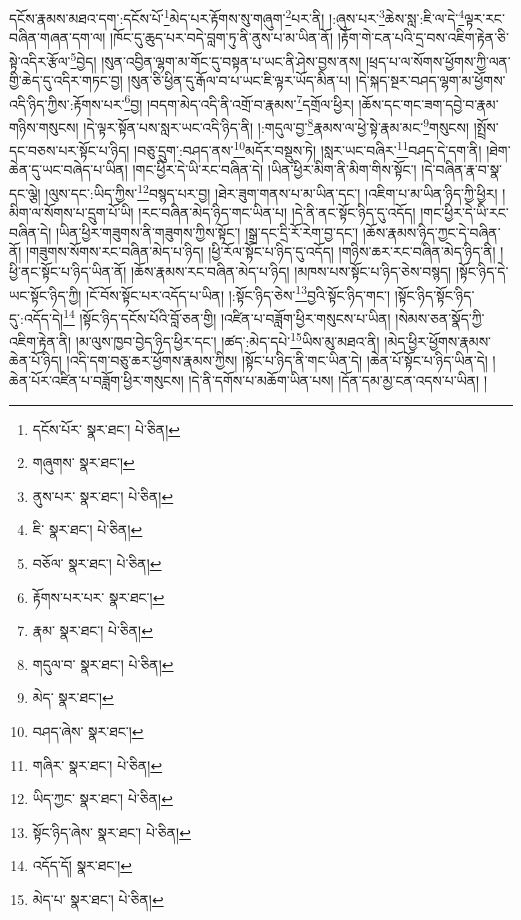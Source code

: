 དངོས་རྣམས་མཐའ་དག་:དངོས་པོ་\footnote{དངོས་པོར་  སྣར་ཐང་།  པེ་ཅིན། }མེད་པར་རྟོགས་སུ་གཞུག་\footnote{གཞུགས་  སྣར་ཐང་། }པར་ནི། །:ཞུས་པར་\footnote{ནུས་པར་  སྣར་ཐང་།  པེ་ཅིན། }ཆེས་སླ་:ཇི་ལ་དེ་\footnote{ཇི་  སྣར་ཐང་།  པེ་ཅིན། }ལྟར་རང་བཞིན་གཞན་དག་ལ། །ཁོང་དུ་ཆུད་པར་བདེ་བླག་ཏུ་ནི་ནུས་པ་མ་ཡིན་ནོ། །རྟོག་གེ་ངན་པའི་དྲ་བས་འཇིག་རྟེན་ཅི་སྟེ་འདིར་རྩོལ་\footnote{བཅོལ་  སྣར་ཐང་།  པེ་ཅིན། }བྱེད། །སུན་འབྱིན་ལྷག་མ་གོང་དུ་བསྟན་པ་ཡང་ནི་ཤེས་བྱས་ནས། །ཕྲད་པ་ལ་སོགས་ཕྱོགས་ཀྱི་ལན་གྱི་ཆེད་དུ་འདིར་གཏང་བྱ། །སུན་ཅི་ཕྱིན་དུ་རྒོལ་བ་པ་ཡང་ཇི་ལྟར་ཡོད་མིན་པ། །དེ་སྐད་སྔར་བཤད་ལྷག་མ་ཕྱོགས་འདི་ཉིད་ཀྱིས་:རྟོགས་པར་\footnote{རྟོགས་པར་པར་  སྣར་ཐང་། }བྱ། །བདག་མེད་འདི་ནི་འགྲོ་བ་རྣམས་\footnote{རྣམ་  སྣར་ཐང་།  པེ་ཅིན། }དགྲོལ་ཕྱིར། །ཆོས་དང་གང་ཟག་དབྱེ་བ་རྣམ་གཉིས་གསུངས། །དེ་ལྟར་སྟོན་པས་སླར་ཡང་འདི་ཉིད་ནི། །:གདུལ་བྱ་\footnote{གདུལ་བ་  སྣར་ཐང་།  པེ་ཅིན། }རྣམས་ལ་ཕྱེ་སྟེ་རྣམ་མང་\footnote{མེད་  སྣར་ཐང་། }གསུངས། །སྤྲོས་དང་བཅས་པར་སྟོང་པ་ཉིད། །བཅུ་དྲུག་:བཤད་ནས་\footnote{བཤད་ཞེས་  སྣར་ཐང་། }མདོར་བསྡུས་ཏེ། །སླར་ཡང་བཞིར་\footnote{གཞིར་  སྣར་ཐང་།  པེ་ཅིན། }བཤད་དེ་དག་ནི། །ཐེག་ཆེན་དུ་ཡང་བཞེད་པ་ཡིན། །གང་ཕྱིར་དེ་ཡི་རང་བཞིན་དེ། །ཡིན་ཕྱིར་མིག་ནི་མིག་གིས་སྟོང་། །དེ་བཞིན་རྣ་བ་སྣ་དང་ལྕེ། །ལུས་དང་:ཡིད་ཀྱིས་\footnote{ཡིད་ཀྱང་  སྣར་ཐང་།  པེ་ཅིན། }བསྙད་པར་བྱ། །ཐེར་ཟུག་གནས་པ་མ་ཡིན་དང་། །འཇིག་པ་མ་ཡིན་ཉིད་ཀྱི་ཕྱིར། །མིག་ལ་སོགས་པ་དྲུག་པོ་ཡི། །རང་བཞིན་མེད་ཉིད་གང་ཡིན་པ། །དེ་ནི་ནང་སྟོང་ཉིད་དུ་འདོད། །གང་ཕྱིར་དེ་ཡི་རང་བཞིན་དེ། །ཡིན་ཕྱིར་གཟུགས་ནི་གཟུགས་ཀྱིས་སྟོང་། །སྒྲ་དང་དྲི་རོ་རེག་བྱ་དང་། །ཆོས་རྣམས་ཉིད་ཀྱང་དེ་བཞིན་ནོ། །གཟུགས་སོགས་རང་བཞིན་མེད་པ་ཉིད། །ཕྱི་རོལ་སྟོང་པ་ཉིད་དུ་འདོད། །གཉིས་ཆར་རང་བཞིན་མེད་ཉིད་ནི། །ཕྱི་ནང་སྟོང་པ་ཉིད་ཡིན་ནོ། །ཆོས་རྣམས་རང་བཞིན་མེད་པ་ཉིད། །མཁས་པས་སྟོང་པ་ཉིད་ཅེས་བསྙད། །སྟོང་ཉིད་དེ་ཡང་སྟོང་ཉིད་ཀྱི། །ངོ་བོས་སྟོང་པར་འདོད་པ་ཡིན། །:སྟོང་ཉིད་ཅེས་\footnote{སྟོང་ཉིད་ཞེས་  སྣར་ཐང་།  པེ་ཅིན། }བྱའི་སྟོང་ཉིད་གང་། །སྟོང་ཉིད་སྟོང་ཉིད་དུ་:འདོད་དེ།\footnote{འདོད་དོ།  སྣར་ཐང་། } །སྟོང་ཉིད་དངོས་པོའི་བློ་ཅན་གྱི། །འཛིན་པ་བཟློག་ཕྱིར་གསུངས་པ་ཡིན། །སེམས་ཅན་སྣོད་ཀྱི་འཇིག་རྟེན་ནི། །མ་ལུས་ཁྱབ་བྱེད་ཉིད་ཕྱིར་དང་། །ཚད་:མེད་དཔེ་\footnote{མེད་པ་  སྣར་ཐང་།  པེ་ཅིན། }ཡིས་མུ་མཐའ་ནི། །མེད་ཕྱིར་ཕྱོགས་རྣམས་ཆེན་པོ་ཉིད། །འདི་དག་བཅུ་ཆར་ཕྱོགས་རྣམས་ཀྱིས། །སྟོང་པ་ཉིད་ནི་གང་ཡིན་དེ། །ཆེན་པོ་སྟོང་པ་ཉིད་ཡིན་དེ། །ཆེན་པོར་འཛིན་པ་བཟློག་ཕྱིར་གསུངས། །དེ་ནི་དགོས་པ་མཆོག་ཡིན་པས། །དོན་དམ་མྱ་ངན་འདས་པ་ཡིན། །
